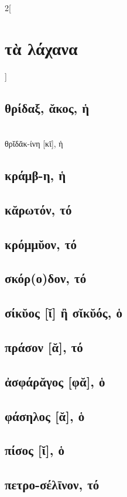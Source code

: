 \documentclass{book}
\begin{document}
\begin{multicols}{2}[\section{τὰ λάχανα}]
\subsection{θρίδαξ, ᾰκος, ἡ}
 ~\\ 
θρῐδᾰκ-ίνη [κῑ], ἡ
\subsection{κράμβ-η, ἡ}
\subsection{κᾰρωτόν, τό}
\subsection{κρόμμῠον, τό}
\subsection{σκόρ(ο)δον, τό}
\subsection{σίκῠος [ῐ] ἢ σῐκῠός, ὁ}
\subsection{πράσον [ᾰ], τό}
\subsection{ἀσφάρᾰγος [φᾰ], ὁ}
\subsection{φάσηλος [ᾰ], ὁ}
\subsection{πίσος [ῐ], ὁ}
\subsection{πετρο-σέλῑνον, τό}

\end{multicols}
\end{document}
